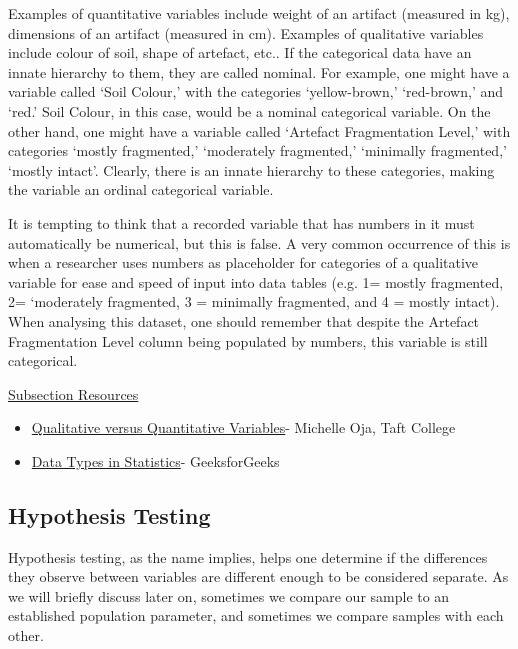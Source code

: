 \documentclass{article}
\begin{document}
Examples of quantitative variables include weight of an artifact (measured in kg), dimensions of an artifact (measured in cm).
Examples of qualitative variables include colour of soil, shape of artefact, etc.. If the categorical data have an innate hierarchy to them, they are called nominal. For example, one might have a variable called ‘Soil Colour,’ with the categories ‘yellow-brown,’ ‘red-brown,’ and ‘red.’ Soil Colour, in this case, would be a nominal categorical variable. On the other hand, one might have a variable called ‘Artefact Fragmentation Level,’ with categories ‘mostly fragmented,’ ‘moderately fragmented,’ ‘minimally fragmented,’ ‘mostly intact’. Clearly, there is an innate hierarchy to these categories, making the variable an ordinal categorical variable. 

It is tempting to think that a recorded variable that has numbers in it must automatically be numerical, but this is false. A very common occurrence of this is when a researcher uses numbers as placeholder for categories of a qualitative variable for ease and speed of input into data tables (e.g. 1= mostly fragmented, 2= ‘moderately fragmented, 3 = minimally fragmented, and 4 = mostly intact). When analysing this dataset, one should remember that despite  the Artefact Fragmentation Level column being populated by numbers, this variable is still categorical. 

\underline{Subsection Resources}
\begin{itemize}
    \item \href{https://stats.libretexts.org/Workbench/PSYC_2200%3A_Elementary_Statistics_for_Behavioral_and_Social_Science_(Oja)_WITHOUT_UNITS/01%3A_Introduction_to_Behavioral_Statistics/1.04%3A_Types_of_Data_and_How_to_Measure_Them/1.4.02%3A_Qualitative_versus_Quantitative_Variables}{Qualitative versus Quantitative Variables}- Michelle Oja, Taft College
    \item \href{https://www.geeksforgeeks.org/data-types-in-statistics/}{Data Types in Statistics}- GeeksforGeeks 
\end{itemize}

\subsection{Hypothesis Testing}
Hypothesis testing, as the name implies, helps one determine if the differences they observe between variables are different enough to be considered separate. As we will briefly discuss later on, sometimes we compare our sample to an established population parameter, and sometimes we compare samples with each other.
\end{document}

